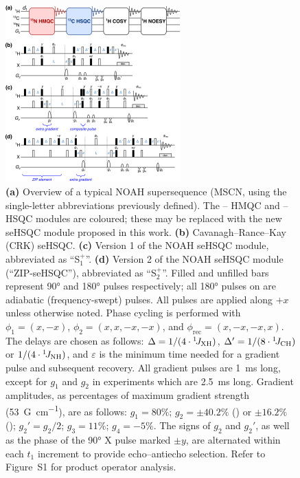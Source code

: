\documentclass[final,twocolumn]{elsarticle}
\newcommand*{\noahSpa}{S$^+_1$}
\newcommand*{\noahSpb}{S$^+_2$}
\newcommand*{\carbon}{\ce{^{13}C}}
\newcommand*{\proton}{\ce{^{1}H}}
\newcommand*{\nitrogen}{\ce{^{15}N}}
\newcommand*{\onejxh}{{}^{1}\!J_{\ce{XH}}}
\newcommand*{\onejch}{{}^{1}\!J_{\ce{CH}}}
\newcommand*{\onejnh}{{}^{1}\!J_{\ce{NH}}}
\begin{document}
\begin{figure}[!ht]
    \centering
    \includegraphics[width=0.6\textwidth]{pprogs.png}
    \caption{
        \textbf{(a)} Overview of a typical NOAH supersequence (MSCN, using the single-letter abbreviations previously defined\cite{Kupce2017ACIE}).
        The \proton{}--\nitrogen{} HMQC and \proton{}--\carbon{} HSQC modules are coloured; these may be replaced with the new seHSQC module proposed in this work.
        \textbf{(b)} Cavanagh--Rance--Kay (CRK) seHSQC.\cite{Palmer1991JMR, Kay1992JACS}
        \textbf{(c)} Version 1 of the NOAH seHSQC module, abbreviated as ``\noahSpa{}''.
        \textbf{(d)} Version 2 of the NOAH seHSQC module (``ZIP-seHSQC''), abbreviated as ``\noahSpb{}''.
        Filled and unfilled bars represent \ang{90} and \ang{180} pulses respectively; all \ang{180} pulses on \carbon{} are adiabatic (frequency-swept) pulses.
        All pulses are applied along $+x$ unless otherwise noted.
        Phase cycling is performed with $\phi_1 = (x, -x)$, $\phi_2 = (x, x, -x, -x)$, and $\phi_{\mathrm{rec}} = (x, -x, -x, x)$.
        The delays are chosen as follows: $\Delta = 1/(4\cdot\onejxh)$, $\Delta' = 1/(8\cdot\onejch)$ or $1/(4\cdot\onejnh)$, and $\varepsilon$ is the minimum time needed for a gradient pulse and subsequent recovery.
        All gradient pulses are \SI{1}{\ms} long, except for $g_1$ and $g_2$ in \nitrogen{} experiments which are \SI{2.5}{\ms} long.
        Gradient amplitudes, as percentages of maximum gradient strength (\SI{53}{G\per\cm}), are as follows: $g_1 = 80\%$; $g_2 = \pm 40.2\%$ (\carbon{}) or $\pm 16.2\%$ (\nitrogen{}); ${g_2}' = g_2/2$; $g_3 = 11\%$; $g_4 = -5\%$.
        The signs of $g_2$ and ${g_2}'$, as well as the phase of the \ang{90} X pulse marked $\pm y$, are alternated within each $t_1$ increment to provide echo--antiecho selection.
        Refer to Figure~S1 for product operator analysis.
    }
    \label{fig:pprogs}
\end{figure}
\end{document}
